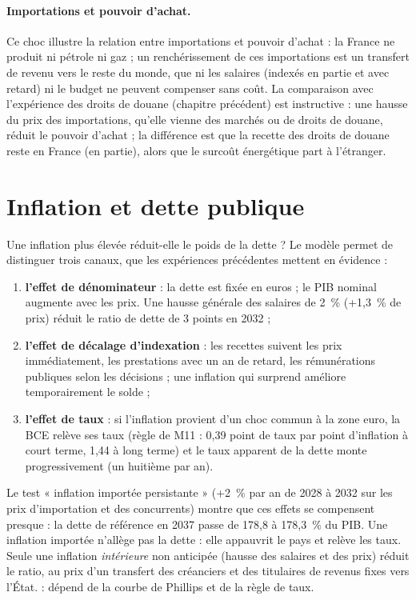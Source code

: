 \paragraph{Importations et pouvoir d'achat.} Ce choc illustre la relation entre importations et pouvoir d'achat : la
France ne produit ni pétrole ni gaz ; un renchérissement de ces importations est un transfert de revenu vers le reste du
monde, que ni les salaires (indexés en partie et avec retard) ni le budget ne peuvent compenser sans coût. La
comparaison avec l'expérience des droits de douane (chapitre précédent) est instructive : une hausse du prix des
importations, qu'elle vienne des marchés ou de droits de douane, réduit le pouvoir d'achat ; la différence est que la
recette des droits de douane reste en France (en partie), alors que le surcoût énergétique part à l'étranger.

\section{Inflation et dette publique}

Une inflation plus élevée réduit-elle le poids de la dette ? Le modèle permet de distinguer trois canaux, que les
expériences précédentes mettent en évidence :
\begin{enumerate}
\item \textbf{l'effet de dénominateur} : la dette est fixée en euros ; le PIB nominal augmente avec les prix. Une hausse
générale des salaires de 2~\% (+1,3~\% de prix) réduit le ratio de dette de 3 points en 2032 ;
\item \textbf{l'effet de décalage d'indexation} : les recettes suivent les prix immédiatement, les prestations avec un an
de retard, les rémunérations publiques selon les décisions ; une inflation qui surprend améliore temporairement le
solde ;
\item \textbf{l'effet de taux} : si l'inflation provient d'un choc commun à la zone euro, la BCE relève ses taux (règle
de M11 : 0,39 point de taux par point d'inflation à court terme, 1,44 à long terme) et le taux apparent de la dette
monte progressivement (un huitième par an).
\end{enumerate}
Le test « inflation importée persistante » (+2~\% par an de 2028 à 2032 sur les prix d'importation et des concurrents)
montre que ces effets se compensent presque : la dette de référence en 2037 passe de 178,8 à 178,3~\% du PIB. Une
inflation importée n'allège pas la dette : elle appauvrit le pays et relève les taux. Seule une inflation \emph{intérieure}
non anticipée (hausse des salaires et des prix) réduit le ratio, au prix d'un transfert des créanciers et des
titulaires de revenus fixes vers l'État.  : dépend de la courbe de Phillips et de la règle de taux.

